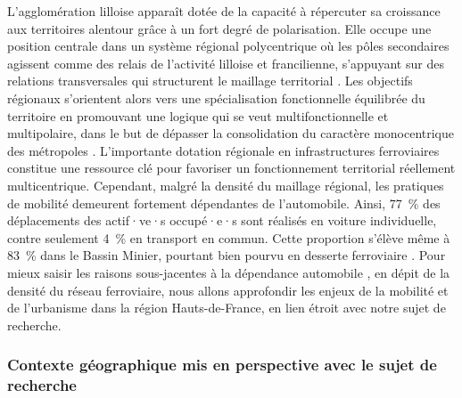 \begin{refsegment}
L’agglomération lilloise apparaît dotée de la capacité à répercuter sa croissance aux territoires alentour grâce à un fort degré de polarisation. Elle occupe une position centrale dans un système régional polycentrique où les pôles secondaires agissent comme des relais de l’activité lilloise et francilienne, s’appuyant sur des relations transversales qui structurent le maillage territorial \textcolor{blue}{\autocite[43, 46]{adulm_metropolisation_2016}}. Les objectifs régionaux s’orientent alors vers une spécialisation fonctionnelle équilibrée du territoire en promouvant une logique qui se veut multifonctionnelle et multipolaire, dans le but de dépasser la consolidation du caractère monocentrique des métropoles \textcolor{blue}{\autocite[144]{lo_feudo_scenario_2014}}. L’importante dotation régionale en infrastructures ferroviaires constitue une ressource clé pour favoriser un fonctionnement territorial réellement multicentrique. Cependant, malgré la densité du maillage régional, les pratiques de mobilité demeurent fortement dépendantes de l’automobile. Ainsi, 77~\% des déplacements des actif·ve·s occupé·e·s sont réalisés en voiture individuelle, contre seulement 4~\% en transport en commun. Cette proportion s'élève même à 83~\% dans le Bassin Minier, pourtant bien pourvu en desserte ferroviaire \textcolor{blue}{\autocite{michel_voiture_2016}}. Pour mieux saisir les raisons sous-jacentes à la dépendance automobile \textcolor{blue}{\autocites[74]{motte-baumvol_territoires_2014}[4]{gallez_dependance_2018}}, en dépit de la densité du réseau ferroviaire, nous allons approfondir les enjeux de la mobilité et de l’urbanisme dans la région Hauts-de-France, en lien étroit avec notre sujet de recherche.%

\subsubsection*{Contexte géographique mis en perspective avec le sujet de recherche
    \label{chap3:region-hdf-intermodalite-tc}
    }


\end{refsegment}
